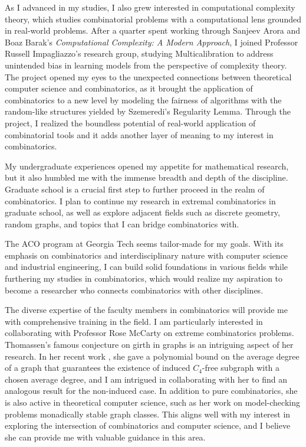 \documentclass[12pt]{article}
\begin{document}
As I advanced in my studies, I also grew interested in computational complexity theory, which
studies combinatorial problems with a computational lens grounded in real-world problems. After a
quarter spent working through Sanjeev Arora and Boaz Barak's \textit{Computational Complexity: A
Modern Approach}\cite{arora2009computational}, I joined Professor Russell Impagliazzo's research
group, studying Multicalibration to address unintended bias in learning models from the perspective
of complexity theory. The project opened my eyes to the unexpected connections between theoretical
computer science and combinatorics, as it brought the application of combinatorics to a new level by
modeling the fairness of algorithms with the random-like structures yielded by Szemeredi's
Regularity Lemma. Through the project, I realized the boundless potential of real-world application
of combinatorial tools and it adds another layer of meaning to my interest in combinatorics.

My undergraduate experiences opened my appetite for mathematical research, but it also humbled me
with the immense breadth and depth of the discipline. Graduate school is a crucial first step to
further proceed in the realm of combinatorics. I plan to continue my research in extremal
combinatorics in graduate school, as well as explore adjacent fields such as discrete geometry,
random graphs, and topics that I can bridge combinatorics with.

The ACO program at Georgia Tech seems tailor-made for my goals. With its emphasis on combinatorics
and interdisciplinary nature with computer science and industrial engineering, I can build solid
foundations in various fields while furthering my studies in combinatorics, which would realize my
aspiration to become a researcher who connects combinatorics with other disciplines. 

The diverse expertise of the faculty members in combinatorics will provide me with comprehensive
training in the field. I am particularly interested in collaborating with Professor Rose McCarty on
extreme combinatorics problems. Thomassen's famous conjecture on girth in graphs is an intriguing
aspect of her research. In her recent work \cite{du2023inducedc4freesubgraphslarge}, she gave a
polynomial bound on the average degree of a graph that guarantees the existence of induced
$C_4$-free subgraph with a chosen average degree, and I am intrigued in collaborating with her to
find an analogous result for the non-induced case. In addition to pure combinatorics, she is also
active in theoretical computer science, such as her work on model-checking problems monadically
stable graph classes\cite{dreier2023firstordermodelcheckingmonadically}. This aligns well with my
interest in exploring the intersection of combinatorics and computer science, and I believe she can
provide me with valuable guidance in this area. 
\end{document}
